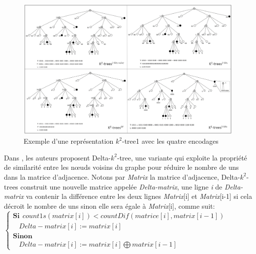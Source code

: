 \begin{figure}[H]
\begin{center}
\includegraphics[height=300 pt, width=450 pt]{./ressources/image/k2-trees1.png} 
\end{center}
\caption{Exemple d'une représentation $k^2$-tree1 avec les quatre encodages}
\label{k2-trees1-exemple}
\end{figure}



Dans \citep{zhang2014delta}, les auteurs proposent Delta-$k^2$-tree, une variante qui exploite la propriété de similarité entre les nœuds voisins du graphe pour réduire le nombre de uns dans la matrice d'adjacence. Notons par \textit{Matrix} la matrice d'adjacence, Delta-$k^2$-trees construit une nouvelle matrice appelée \textit{Delta-matrix}, une ligne \textit{i} de \textit{Delta-matrix} va contenir la différence entre les deux lignes \textit{Matrix}[i] et  \textit{Matrix}[i-1] si cela décroit le nombre de uns sinon elle sera égale à \textit{Matrix}[i], comme suit: \\

$\left\{
\begin{array}{llcl}
\textbf{Si}\ \ count1s(matrix[i]) < countDif(matrice[i],matrix[i-1])\\
\ \ \ \ Delta-matrix[i]  := matrix[i]  \\
\textbf{Sinon} & & &\\
\ \ \ \ Delta-matrix[i]  := matrix[i] \bigoplus matrix[i-1] & 
\end{array}
\right.$\\

